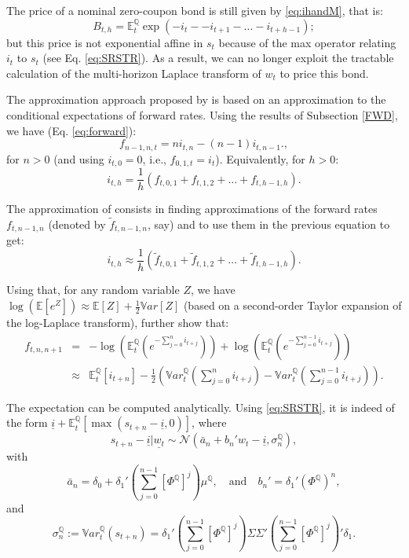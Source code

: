 \documentclass[
  12pt,
]{book}
\theoremstyle{definition}
\theoremstyle{definition}
\theoremstyle{definition}
\theoremstyle{definition}
\theoremstyle{remark}
\begin{document}
The price of a nominal zero-coupon bond is still given by \eqref{eq:ihandM}, that is:
\[
B_{t,h} = \mathbb{E}^{\mathbb{Q}}_t \exp(-i_t--i_{t+1}-\dots-i_{t+h-1});
\]
but this price is not exponential affine in \(s_t\) because of the max operator relating \(i_t\) to \(s_t\) (see Eq. \eqref{eq:SRSTR}). As a result, we can no longer exploit the tractable calculation of the multi-horizon Laplace transform of \(w_t\) to price this bond.

The approximation approach proposed by \citet{Wu_Xia_2016} is based on an approximation to the conditional expectations of forward rates. Using the results of Subsection \ref{FWD}, we have (Eq. \eqref{eq:forward}):
\[
f_{n-1,n,t} = n i_{t,n} - (n-1) i_{t,n-1}.,
\]
for \(n>0\) (and using \(i_{t,0}=0\), i.e., \(f_{0,1,t}=i_t\)). Equivalently, for \(h>0\):
\[
i_{t,h} =  \frac{1}{h}(f_{t,0,1}+f_{t,1,2}+\dots+f_{t,h-1,h}).
\]

The approximation of \citet{Wu_Xia_2016} consists in finding approximations of the forward rates \(f_{t,n-1,n}\) (denoted by \(\tilde{f}_{t,n-1,n}\), say) and to use them in the previous equation to get:
\begin{equation}
i_{t,h} \approx  \frac{1}{h}\left(\tilde{f}_{t,0,1}+\tilde{f}_{t,1,2}+\dots+\tilde{f}_{t,h-1,h}\right).\label{eq:RapproxSR}
\end{equation}

Using that, for any random variable \(Z\), we have \(\log(\mathbb{E}[e^Z]) \approx \mathbb{E}[Z] + \frac{1}{2} \mathbb{V}ar[Z]\) (based on a second-order Taylor expansion of the log-Laplace transform), \citet{Wu_Xia_2016} further show that:
\begin{eqnarray}
f_{t,n,n+1} &=& -\log\left(\mathbb{E}_t^{\mathbb{Q}}\left(e^{-\sum_{j=0}^n i_{t+j}}\right)\right) + \log\left(\mathbb{E}_t^{\mathbb{Q}}\left(e^{-\sum_{j=0}^{n-1} i_{t+j}}\right)\right)\\
&\approx& \mathbb{E}_t^{\mathbb{Q}}[i_{t+n}] - \frac{1}{2}\left(\mathbb{V}ar_t^{\mathbb{Q}}\left(\sum_{j=0}^n i_{t+j}\right)-\mathbb{V}ar_t^{\mathbb{Q}}\left(\sum_{j=0}^{n-1} i_{t+j}\right)\right).
\end{eqnarray}

The expectation can be computed analytically. Using \eqref{eq:SRSTR}, it is indeed of the form \(\underline{i} + \mathbb{E}_t^{\mathbb{Q}}[ \max(s_{t+n}-\underline{i},0)]\), where
\[
s_{t+n}-\underline{i}|\underline{w_t} \sim \mathcal{N}\left(\bar{a}_n+b_n'w_t- \underline{i},\sigma_n^{\mathbb{Q}}\right),
\]
with
\[
\bar{a}_n = \delta_0 + \delta_1'\left(\sum_{j=0}^{n-1} \left[\Phi^{\mathbb{Q}}\right]^j\right)\mu^{\mathbb{Q}}, \quad \mbox{and} \quad b_n' = \delta_1'\left(\Phi^{\mathbb{Q}}\right)^n,
\]
and
\[
\sigma_n^{\mathbb{Q}} := \mathbb{V}ar^{\mathbb{Q}}_t\left(s_{t+n}\right)= \delta_1'\left(\sum_{j=0}^{n-1} \left[\Phi^{\mathbb{Q}}\right]^j\right)\Sigma \Sigma' \left(\sum_{j=0}^{n-1} \left[\Phi^{\mathbb{Q}}\right]^j\right)'\delta_1.
\]
\end{document}
